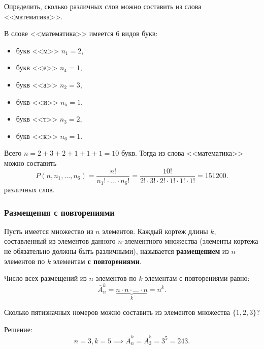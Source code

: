 \begin{example*}
    Определить, сколько различных слов можно составить из слова <<математика>>.

    В слове <<математика>> имеется 6 видов букв:
    \begin{multicols}{3}
        \begin{itemize}[label={}]
            \item букв <<м>> \(n_1 = 2\),
            \item букв <<е>> \(n_4 = 1\),
        \end{itemize}
        \begin{itemize}[label={}]
            \item букв <<а>> \(n_2 = 3\),
            \item букв <<и>> \(n_5 = 1\),
        \end{itemize}
        \begin{itemize}[label={}]
            \item букв <<т>> \(n_3 = 2\),
            \item букв <<к>> \(n_6 = 1\).
        \end{itemize}
    \end{multicols}
    Всего \(n = 2 + 3 + 2 + 1 + 1 + 1 = 10\) букв. Тогда из слова <<математика>> можно составить
    \[
        P(n, n_1, \ldots, n_6) = \frac{n!}{n_1! \cdot \ldots \cdot n_6!} = \frac{10!}{2! \cdot 3! \cdot 2! \cdot 1! \cdot 1! \cdot 1!} = 151200.
    \]
    различных слов.
\end{example*}

\subsubsection{Размещения с повторениями}

Пусть имеется множество из \(n\) элементов. Каждый кортеж длины \(k\), составленный из элементов данного \(n\)-элементного множества (элементы кортежа не обязательно должны быть различными), называется \textbf{размещением} из \(n\) элементов по \(k\) элементам \textbf{с повторениями}.

\begin{theorem*}
    Число всех размещений из \(n\) элементов по \(k\) элементам с повторениями равно:
    \[
        \bar{A}_n^k = \underbrace{n \cdot n \cdot \ldots \cdot n}_k = n^k.
    \]
\end{theorem*}

\begin{example*}
    Сколько пятизначных номеров можно составить из элементов множества \(\{1, 2, 3\}\)?

    Решение:
    \[
        n = 3, k = 5
        \implies
        \bar{A}_n^k = \bar{A}_3^5 = 3^5 = 243.
    \]
\end{example*}

